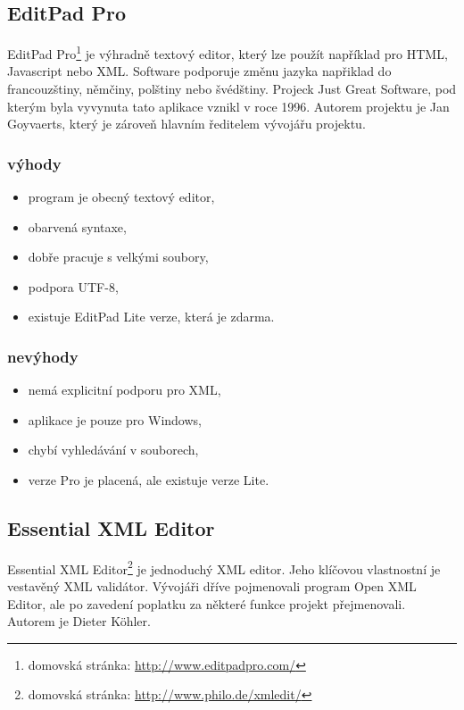         \subsection{EditPad Pro}
            EditPad Pro\footnote{domovská stránka: \url{http://www.editpadpro.com/}} je výhradně textový editor, který lze použít například pro HTML, Javascript nebo XML. Software podporuje změnu jazyka napřiklad do francouzštiny, němčiny, polštiny nebo švédštiny. Projeck Just Great Software, pod kterým byla vyvynuta tato aplikace vznikl v roce 1996. Autorem projektu je Jan Goyvaerts, který je zároveň hlavním ředitelem vývojářu projektu.

            \subsubsection{výhody}
                \begin{itemize}
                    \item program je obecný textový editor,
                    \item obarvená syntaxe,
                    \item dobře pracuje s velkými soubory,
                    \item podpora UTF-8,
                    \item existuje EditPad Lite verze, která je zdarma.
                \end{itemize}
                
            \subsubsection{nevýhody}
                \begin{itemize}
                    \item nemá explicitní podporu pro XML,
                    \item aplikace je pouze pro Windows,
                    \item chybí vyhledávání v souborech,
                    \item verze Pro je placená, ale existuje verze Lite.
                \end{itemize}
                
        \subsection{Essential XML Editor}
            Essential XML Editor\footnote{domovská stránka: \url{http://www.philo.de/xmledit/}} je jednoduchý XML editor. Jeho klíčovou vlastnostní je vestavěný XML validátor. Vývojáři dříve pojmenovali program Open XML Editor, ale po zavedení poplatku za některé funkce projekt přejmenovali. Autorem je Dieter Köhler. 
            
